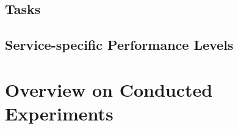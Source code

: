 \subsection{Tasks}

\subsection{Service-specific Performance Levels}

\section{Overview on Conducted Experiments}


